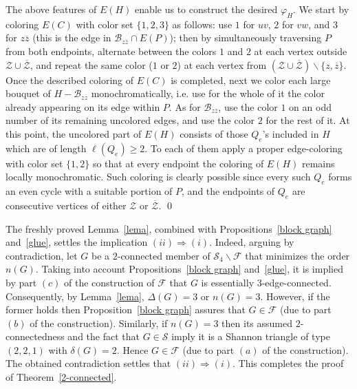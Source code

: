 \documentclass[a4paper,12pt]{article}
\numberwithin{equation}{section}
\begin{document}
The above features of $E(H)$ enable us to construct the desired $\varphi_H$. We start by coloring $E(C)$ with color set $\{1,2,3\}$ as follows: use $1$ for $uv$, $2$ for $vw$, and $3$ for $z\overline{z}$ (this is the edge in $\mathcal{B}_{z\overline{z}}\cap E(P)$); then by simultaneously traversing $P$ from both endpoints, alternate between the colors $1$ and $2$ at each vertex outside $\mathcal{Z}\cup \overline{\mathcal{Z}}$, and repeat the same color ($1$ or $2$) at each vertex from $(\mathcal{Z}\cup \overline{\mathcal{Z}})\backslash\{z,\overline{z}\}$. Once the described coloring of $E(C)$ is completed, next we color each large bouquet of $H-\mathcal{B}_{z\overline{z}}$ monochromatically, i.e. use for the whole of it the color already appearing on its edge within $P$. As for $\mathcal{B}_{z\overline{z}}$, use the color $1$ on an odd number of its remaining uncolored edges, and use the color $2$ for the rest of it. At this point, the uncolored part of $E(H)$ consists of those $Q_e$'s included in $H$ which are of length $\ell(Q_e)\geq2$. To each of them apply a proper edge-coloring with color set $\{1,2\}$ so that at every endpoint the coloring of $E(H)$ remains locally monochromatic. Such coloring is clearly possible since every such $Q_e$ forms an even cycle with a suitable portion of $P$, and the endpoints of $Q_e$ are consecutive vertices of either $\mathcal{Z}$ or $\overline{\mathcal{Z}}$. \qed

\medskip

The freshly proved Lemma~\ref{lema}, combined with Propositions~\ref{block graph} and~\ref{glue}, settles the implication $(ii)\Rightarrow (i)$. Indeed, arguing by contradiction, let $G$ be a $2$-connected member of $\mathcal{S}_4\backslash \mathcal{F}$ that minimizes the order $n(G)$. Taking into account Propositions~\ref{block graph} and~\ref{glue}, it is implied by part $(c)$ of the construction of $\mathcal{F}$ that $G$ is essentially $3$-edge-connected. Consequently, by Lemma~\ref{lema}, $\Delta(G)=3$ or $n(G)=3$. However, if the former holds then Proposition~\ref{block graph} assures that $G\in\mathcal{F}$ (due to part $(b)$ of the construction). Similarly, if $n(G)=3$ then its assumed $2$-connectedness and the fact that $G\in \mathcal{S}$ imply it is a Shannon triangle of type $(2,2,1)$ with $\delta(G)=2$. Hence $G\in \mathcal{F}$ (due to part $(a)$ of the construction). The obtained contradiction settles that $(ii)\Rightarrow (i)$. This completes the proof of Theorem~\ref{2-connected}.
\end{document}
